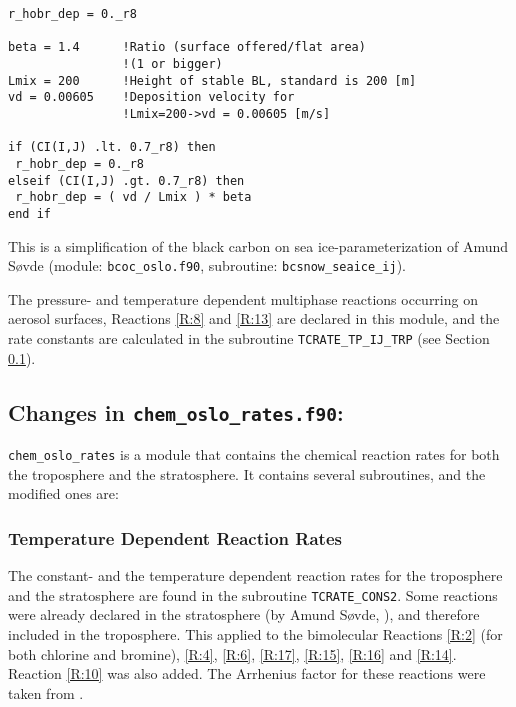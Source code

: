 \begin{lstlisting}
r_hobr_dep = 0._r8

beta = 1.4      !Ratio (surface offered/flat area)
                !(1 or bigger)
Lmix = 200      !Height of stable BL, standard is 200 [m]
vd = 0.00605    !Deposition velocity for 
                !Lmix=200->vd = 0.00605 [m/s]

if (CI(I,J) .lt. 0.7_r8) then
 r_hobr_dep = 0._r8
elseif (CI(I,J) .gt. 0.7_r8) then
 r_hobr_dep = ( vd / Lmix ) * beta
end if
\end{lstlisting}

This is a simplification of the black carbon on sea ice-parameterization of Amund Søvde (module: \texttt{bcoc\_oslo.f90}, subroutine: \texttt{bcsnow\_seaice\_ij}). 

\medskip 

 
The pressure- and temperature dependent multiphase reactions occurring on aerosol surfaces, Reactions \ref{R:8} and \ref{R:13} are declared in this module, and the rate constants are calculated in the subroutine \texttt{TCRATE\_TP\_IJ\_TRP} (see Section \ref{sec:chem_oslo_rates}). 



\subsection{Changes in \texttt{chem\_oslo\_rates.f90}:}\label{sec:chem_oslo_rates}



\texttt{chem\_oslo\_rates} is a module that contains the chemical reaction rates for both the troposphere and the stratosphere. It contains several subroutines, and the modified ones are: 


\subsubsection{Temperature Dependent Reaction Rates}\label{sec:temp_depend_react_rates}

The constant- and the temperature dependent reaction rates for the troposphere and the stratosphere are found in the subroutine \texttt{TCRATE\_CONS2}. Some reactions were already declared in the stratosphere (by Amund Søvde, \cite{SovdeManual}), and therefore included in the troposphere. This applied to the bimolecular Reactions \ref{R:2} (for both chlorine and bromine),  \ref{R:4}, \ref{R:6}, \ref{R:17}, \ref{R:15}, \ref{R:16} and \ref{R:14}. Reaction \ref{R:10} was also added. The Arrhenius factor for these reactions were taken from \cite{JPL}. 

